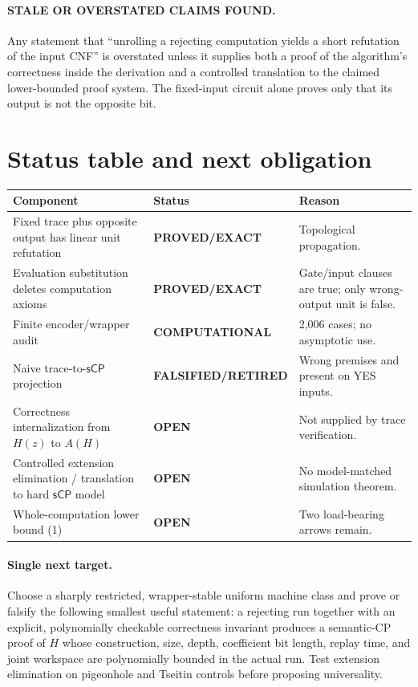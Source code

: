 \documentclass[11pt]{article}
\newcommand{\sCP}{\mathsf{sCP}}
\newcommand{\EXACT}{\textbf{PROVED/EXACT}}
\newcommand{\COMP}{\textbf{COMPUTATIONAL}}
\newcommand{\OPEN}{\textbf{OPEN}}
\newcommand{\RET}{\textbf{FALSIFIED/RETIRED}}
\begin{document}
\paragraph{STALE OR OVERSTATED CLAIMS FOUND.}
Any statement that ``unrolling a rejecting computation yields a short
refutation of the input CNF'' is overstated unless it supplies both a proof of
the algorithm's correctness inside the derivation and a controlled translation
to the claimed lower-bounded proof system.  The fixed-input circuit alone
proves only that its output is not the opposite bit.

\section{Status table and next obligation}
\begin{tabularx}{\textwidth}{@{}l l X@{}}
\toprule
Component & Status & Reason\\
\midrule
Fixed trace plus opposite output has linear unit refutation & \EXACT & Topological propagation.\\
Evaluation substitution deletes computation axioms & \EXACT & Gate/input clauses are true; only wrong-output unit is false.\\
Finite encoder/wrapper audit & \COMP & 2,006 cases; no asymptotic use.\\
Naive trace-to-\(\sCP\) projection & \RET & Wrong premises and present on YES inputs.\\
Correctness internalization from \(H(z)\) to \(A(H)\) & \OPEN & Not supplied by trace verification.\\
Controlled extension elimination / translation to hard \(\sCP\) model & \OPEN & No model-matched simulation theorem.\\
Whole-computation lower bound (1) & \OPEN & Two load-bearing arrows remain.\\
\bottomrule
\end{tabularx}

\paragraph{Single next target.}
Choose a sharply restricted, wrapper-stable uniform machine class and prove or
falsify the following smallest useful statement: a rejecting run together
with an explicit, polynomially checkable correctness invariant produces a
semantic-CP proof of \(H\) whose construction, size, depth, coefficient bit
length, replay time, and joint workspace are polynomially bounded in the
actual run.  Test extension elimination on pigeonhole and Tseitin controls
before proposing universality.
\end{document}
